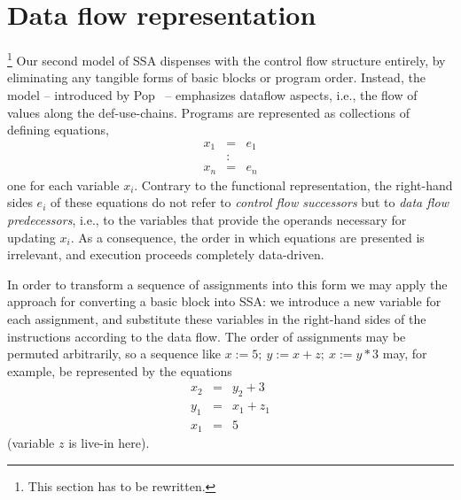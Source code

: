 
\section{Data flow representation}
\label{section:Part1:Semantics:PopSemantics}
\footnote{This section has to be rewritten.}
Our second model of SSA dispenses with the control flow structure
entirely, by eliminating any tangible forms of basic blocks or program
order. Instead, the model -- introduced by Pop~\cite{PopJS2007} --
emphasizes dataflow aspects, i.e., the flow of values along the
def-use-chains.
Programs are represented as collections
of defining equations,
\begin{eqnarray*}
x_1 & = & e_1\\
& : &\\
x_n & = & e_n
\end{eqnarray*}
one for each variable $x_i$. Contrary to the functional
representation, the right-hand sides $e_i$ of these equations do not
refer to \emph{control flow successors} but to \emph{data flow
predecessors}, i.e., to the variables that provide the operands
necessary for updating $x_i$. As a consequence, the order in which
equations are presented is irrelevant, and execution proceeds
completely data-driven.

In order to transform a sequence of assignments into this form we may
apply the approach for converting a basic block into SSA: we introduce
a new variable for each assignment, and substitute these variables in
the right-hand sides of the instructions according to the data
flow. The order of assignments may be permuted arbitrarily, so a
sequence like $x := 5;\ y:=x+z;\ x:=y*3$ may, for example, be
represented by the equations
\begin{eqnarray*}
x_2 & = & y_2 + 3\\
y_1 & = & x_1 + z_1\\
x_1 & = & 5
\end{eqnarray*}
(variable $z$ is live-in here).


